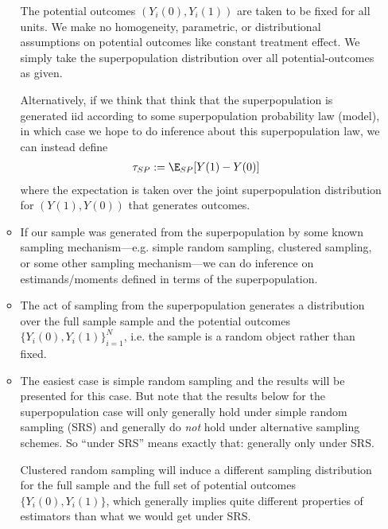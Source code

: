 \documentclass[12pt]{article}
\theoremstyle{plain}
\theoremstyle{definition}
\theoremstyle{remark}
\begin{document}
\begin{itemize}
\begin{itemize}
        The potential outcomes $(Y_i(0),Y_i(1))$ are taken to be fixed
        for all units.
        We make no homogeneity, parametric, or distributional
        assumptions on potential outcomes like constant treatment
        effect.
        We simply take the superpopulation distribution over
        all potential-outcomes as given.

        Alternatively, if we think that think that the superpopulation
        is generated iid according to some superpopulation probability
        law (model), in which case we hope to do inference about this
        superpopulation law, we can instead define
        \begin{align*}
          \tau_{SP}
          &:=
          \E_{SP}[Y(1)-Y(0)]
        \end{align*}
        where the expectation is taken over the joint superpopulation
        distribution for $(Y(1),Y(0))$ that generates outcomes.

      \item
        If our sample was generated from the superpopulation by some
        known sampling mechanism---e.g.  simple random sampling,
        clustered sampling, or some other sampling mechanism---we can
        do inference on estimands/moments defined in terms of the
        superpopulation.

      \item
        The act of sampling from the superpopulation generates a
        distribution over the full sample sample and the potential
        outcomes $\{Y_i(0),Y_i(1)\}_{i=1}^N$, i.e. the sample is a
        random object rather than fixed.

      \item
        The easiest case is simple random sampling and the results will
        be presented for this case.
        But note that the results below for the superpopulation case
        will only generally hold under simple random sampling (SRS) and
        generally do \emph{not} hold under alternative sampling schemes.
        So ``under SRS'' means exactly that: generally only under SRS.

        Clustered random sampling will induce a different sampling
        distribution for the full sample and the full set of potential
        outcomes $\{Y_i(0),Y_i(1)\}$, which generally implies quite
        different properties of estimators than what we would get under
        SRS.


\end{itemize}
\end{itemize}
\end{document}

